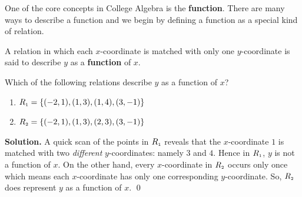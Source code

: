 

\setcounter{footnote}{0}

\label{IntrotoFunctions}

One of the core concepts in College Algebra is the \textbf{function}.  There are many ways to describe a function and we begin by defining a function as a special kind of relation.

\medskip

\colorbox{ResultColor}{\bbm


\begin{defn}

\label{functiondefn}

A relation in which each $x$-coordinate is matched with only one $y$-coordinate is said to describe $y$ as a  \textbf{function} of $x$.

\end{defn}

\ebm}

\medskip

\begin{ex}  Which of the following relations describe $y$ as a function of $x$?

\begin{multicols}{2}

\begin{enumerate}

\item  $R_{\mbox{\tiny$1$}} = \{ (-2,1), (1,3), (1,4), (3,-1) \}$

\item  $R_{\mbox{\tiny$2$}} = \{ (-2,1), (1,3), (2,3), (3,-1) \}$

\end{enumerate}

\end{multicols}

\smallskip

{\bf Solution.}  A quick scan of the points in $R_{\mbox{\tiny$1$}}$ reveals that the $x$-coordinate $1$ is matched with two \emph{different} $y$-coordinates:  namely $3$ and $4$.  Hence in $R_{\mbox{\tiny$1$}}$, $y$ is not a function of $x$.  On the other hand, every $x$-coordinate in $R_{\mbox{\tiny$2$}}$ occurs only once which means each $x$-coordinate has only one corresponding $y$-coordinate.  So, $R_{\mbox{\tiny$2$}}$  does represent $y$ as a function of $x$.  \qed

\end{ex}

